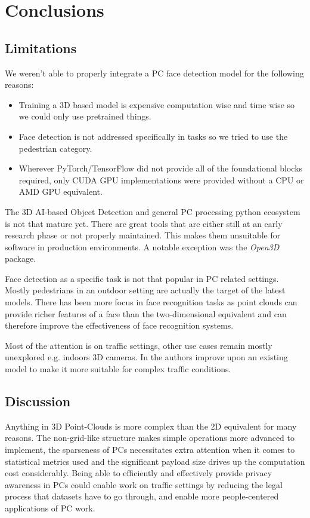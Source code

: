 %
\chapter{Conclusions}
\label{sec:conclusions}

\section{Limitations}

We weren't able to properly integrate a \ac{PC} face detection model for the following reasons:

\begin{itemize}
	\item Training a 3D based model is expensive computation wise and time wise so we could only use pretrained things.
	\item Face detection is not addressed specifically in tasks so we tried to use the pedestrian category.
	\item Wherever PyTorch/TensorFlow did not provide all of the foundational blocks required,
	      only CUDA GPU implementations were provided without a CPU or AMD GPU equivalent.
\end{itemize}

\par The 3D AI-based Object Detection and general \ac{PC} processing python ecosystem is not that mature yet.
There are great tools that are either still at an early research phase or not properly maintained. This makes them unsuitable for software in production environments. A notable exception was the \emph{Open3D} package.

\par Face detection as a specific task is not that popular in \ac{PC} related settings. Mostly pedestrians in an outdoor setting are actually the target of the latest models. There has been more focus in face recognition tasks as point clouds can provide richer features of a face than the two-dimensional equivalent and can therefore improve the effectiveness of face recognition systems.

\par Most of the attention is on traffic settings, other use cases remain mostly unexplored e.g. indoors 3D cameras.
In \cite{wang_voxel-rcnn-complex_2022} the authors improve upon an existing model to make it more suitable for complex traffic conditions.
\section{Discussion}
Anything in 3D Point-Clouds is more complex than the 2D equivalent for many reasons. The non-grid-like structure makes simple operations more advanced to implement, the sparseness of \ac{PC}s necessitates extra attention when it comes to statistical metrics used and the significant payload size drives up the computation cost considerably.
Being able to efficiently and effectively provide privacy awareness in \ac{PC}s could enable work on traffic settings by reducing the legal process that datasets have to go through, and enable more people-centered applications of \ac{PC} work.

